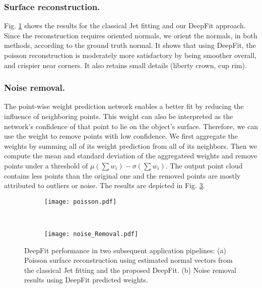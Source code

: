 \subsubsection{Surface reconstruction.}
Fig. \ref{fig:results:poisson_recon} shows the results for the classical Jet fitting and our DeepFit approach. Since the reconstruction requires oriented normals, we orient the normals, in both methods, according to the ground truth normal. It shows that using DeepFit, the poisson reconstruction is moderately more satisfactory by being smoother overall, and crispier near corners. It also retains small details (liberty crown, cup rim).  



\subsubsection{Noise removal.}
The point-wise weight prediction network enables a better fit by reducing the influence of neighboring points. This weight can also be interpreted as the network's confidence of that point to lie on the object's surface. Therefore, we can use the weight to remove points with low confidence.   We first aggregate the weights by summing all of its weight prediction from all of its neighbors. Then we compute the mean and standard deviation of the aggregateed weights and remove points under a threshold of $\mu(\sum w_i)-\sigma(\sum w_i)$.  The output point cloud contains less points than the original one and the removed points are mostly attributed to outliers or noise. The results are depicted in Fig. \ref{fig:results:noise_removal}.

\begin{figure}[t]
\centering
    \begin{subfigure}{.48\textwidth}
        \centering
    	\texttt{[image: poisson.pdf]}
    	\caption{}
    	\label{fig:results:poisson_recon} 
\end{subfigure}
    \unskip\ \vrule\ 
\begin{subfigure}{.48\textwidth}
    \centering
    \texttt{[image: noise\_Removal.pdf]}
    \caption{}
    \label{fig:results:noise_removal}
    \end{subfigure}
    \caption{DeepFit performance in two subsequent application pipelines: (a) Poisson surface reconstruction using estimated normal vectors from the classical Jet fitting and the proposed DeepFit. (b) Noise removal results using DeepFit predicted weights.}
\end{figure}